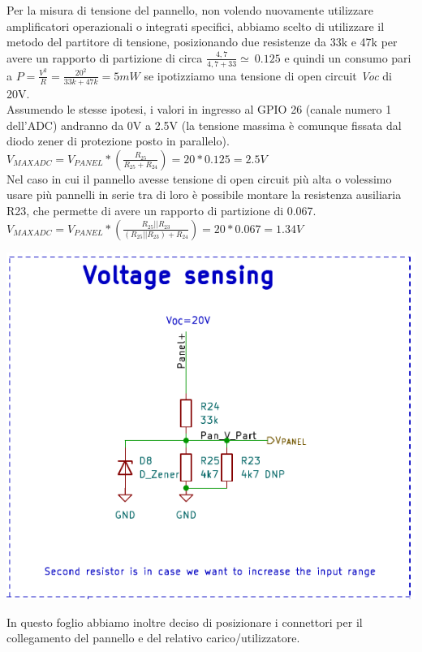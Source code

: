 \noindent Per la misura di tensione del pannello, non volendo nuovamente
utilizzare amplificatori operazionali o integrati specifici, abbiamo
scelto di utilizzare il metodo del partitore di tensione, posizionando
due resistenze da 33k e 47k per avere un rapporto di partizione di circa
\(\frac{4,7}{4,7 + 33} \simeq \ 0.125\) e quindi un consumo pari a 
\(P=\frac{V^{2}}{R}=\frac{20^{2}}{33k+47k}=5mW\)
se ipotizziamo una tensione di open circuit \emph{Voc} di 20V.\\
Assumendo le stesse ipotesi, i valori in ingresso al
GPIO 26 (canale numero 1 dell'ADC) andranno da 0V a 2.5V (la tensione
massima è comunque fissata dal diodo zener di protezione posto in
parallelo).\\
\(V_{MAXADC}=V_{PANEL}*(\frac{R_{25}}{R_{25}+R_{24}})=20*0.125 =2.5 V\)\\
Nel caso in cui il pannello avesse tensione di open circuit più alta o
volessimo usare più pannelli in serie tra di loro è possibile montare la
resistenza ausiliaria R23, che permette di avere un rapporto di
partizione di 0.067.\\
\(V_{MAXADC}=V_{PANEL}*(\frac{R_{25}||R_{23}}{(R_{25}||R_{23})+R_{24}})=20*0.067 =1.34 V \) 

\begin{center}
\includegraphics[scale=0.7]{figures/image62.png}
\captionsetup{type=figure}
\end{center}

\noindent In questo foglio abbiamo inoltre deciso di posizionare i connettori per
il collegamento del pannello e del relativo carico/utilizzatore.

